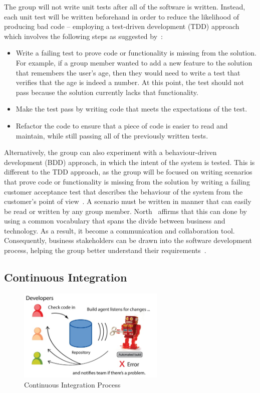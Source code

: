 The group will not write unit tests after all of the software is written. Instead, each unit test will be written beforehand in order to reduce the likelihood of producing bad code -- employing a test-driven development (TDD) approach which involves the following steps as suggested by~\cite{book:art_of_unit_testing}:

\begin{itemize}
  \item Write a failing test to prove code or functionality is missing from the solution. For example, if a group member wanted to add a new feature to the solution that remembers the user’s age, then they would need to write a test that verifies that the age is indeed a number. At this point, the test should not pass because the solution currently lacks that functionality.
  \item Make the test pass by writing code that meets the expectations of the test.
  \item Refactor the code to ensure that a piece of code is easier to read and maintain, while still passing all of the previously written tests.
\end{itemize}

Alternatively, the group can also experiment with a behaviour-driven development (BDD) approach, in which the intent of the system is tested. This is different to the TDD approach, as the group will be focused on writing scenarios that prove code or functionality is missing from the solution by writing a failing customer acceptance test that describes the behaviour of the system from the customer's point of view~\parencite{book:art_of_unit_testing}. A scenario must be written in manner that can easily be read or written by any group member. North~\parencite{web:behaviour_driven_development} affirms that this can done by using a common vocabulary that spans the divide between business and technology. As a result, it become a communication and collaboration tool. Consequently, business stakeholders can be drawn into the software development process, helping the group better understand their requirements~\parencite{web:behaviour_driven_development}.

\subsection{Continuous Integration}

\begin{figure}
  \centering
  \begin{minipage}{7cm}
    \centering
    \includegraphics[width=7cm]{inc/continuous_integration_process.jpg}
    \caption{Continuous Integration Process}
    \label{fig:continuous_integration_process}
  \end{minipage}
\end{figure}

